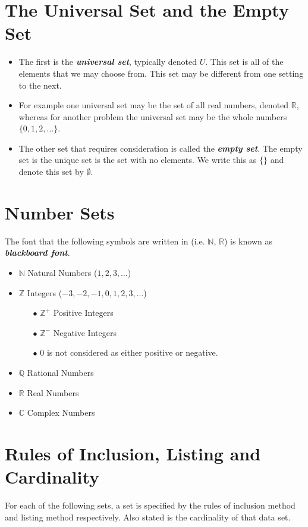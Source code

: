 \documentclass[a4paper,12pt]{article}
\begin{document}
\Large
\section*{The Universal Set and the Empty Set}
\begin{itemize}
	\item The first is the \textbf{\textit{universal set}}, typically denoted $U$. This set is all of the elements that we may choose from. This set may be different from one setting to the next. 
	
	\item For example one universal set may be the set of all real numbers, denoted $\mathbb{R}$, whereas for another problem the universal set may be the whole numbers $\{0, 1, 2,\ldots\}$.
	
	\item The other set that requires consideration is called the \textit{\textbf{empty set}}. The empty set is the unique set is the set with no elements. We write this as $\{ \}$ and denote this set by $\emptyset$.
\end{itemize}
\section*{Number Sets}
The font that the following symbols are written in (i.e. $\mathbb{N}$, $\mathbb{R}$) is known as \textit{\textbf{blackboard font}}.
\begin{itemize}
	\item $\mathbb{N}$ Natural Numbers ($1,2,3,\ldots$) 
	\item $\mathbb{Z}$ Integers ($-3,-2,-1,0,1,2,3, \ldots$)
	\begin{itemize}
		\item[$\bullet$] $\mathbb{Z}^{+}$ Positive Integers
		\item[$\bullet$] $\mathbb{Z}^{-}$ Negative Integers
		\item[$\bullet$] 0 is not considered as either positive or negative.
	\end{itemize}
	\item $\mathbb{Q}$ Rational Numbers
	\item $\mathbb{R}$ Real Numbers
	\item $\mathbb{C}$ Complex Numbers
\end{itemize}
\newpage
\section*{Rules of Inclusion, Listing and Cardinality}
For each of the following sets, a set is specified by the rules of inclusion method and listing method respectively. Also stated is the cardinality of that data set.
\end{document}
